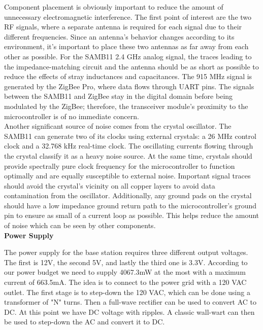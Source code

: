 \documentclass[journal,compsoc]{IEEEtran}
\begin{document}
\noindent Component placement is obviously important to reduce the amount of unnecessary electromagnetic interference.  The first point of interest are the two RF signals, where a separate antenna is required for each signal due to their different frequencies.  Since an antenna’s behavior changes according to its environment, it’s important to place these two antennas as far away from each other as possible.  For the SAMB11 2.4 GHz analog signal, the traces leading to the impedance-matching circuit and the antenna should be as short as possible to reduce the effects of stray inductances and capacitances.  The 915 MHz signal is generated by the ZigBee Pro, where data flows through UART pins.  The signals between the SAMB11 and ZigBee stay in the digital domain before being modulated by the ZigBee;  therefore, the transceiver module’s proximity to the microcontroller is of no immediate concern.\\

\noindent Another significant source of noise comes from the crystal oscillator.  The SAMB11 can generate two of its clocks using external crystals: a 26 MHz control clock and a 32.768 kHz real-time clock.  The oscillating currents flowing through the crystal classify it as a heavy noise source.  At the same time, crystals should provide spectrally pure clock frequency for the microcontroller to function optimally and are equally susceptible to external noise.  Important signal traces should avoid the crystal’s vicinity on all copper layers to avoid data contamination from the oscillator.  Additionally, any ground pads on the crystal should have a low impedance ground return path to the microcontroller’s ground pin to ensure as small of a current loop as possible.  This helps reduce the amount of noise which can be seen by other components.\\

\noindent \textbf {Power Supply}

\noindent The power supply for the base station requires three different output voltages.  The first is 12V, the second 5V, and lastly the third one is 3.3V.  According to our power budget we need to supply 4067.3mW at the most with a maximum current of 663.5mA.  The idea is to connect to the power grid with a 120 VAC outlet.  The first stage is to step-down the 120 VAC, which can be done using a transformer of "N" turns.  Then a full-wave rectifier can be used to convert AC to DC.  At this point we have DC voltage with ripples.  A classic wall-wart can then be used to step-down the AC and convert it to DC.\\
\end{document}
